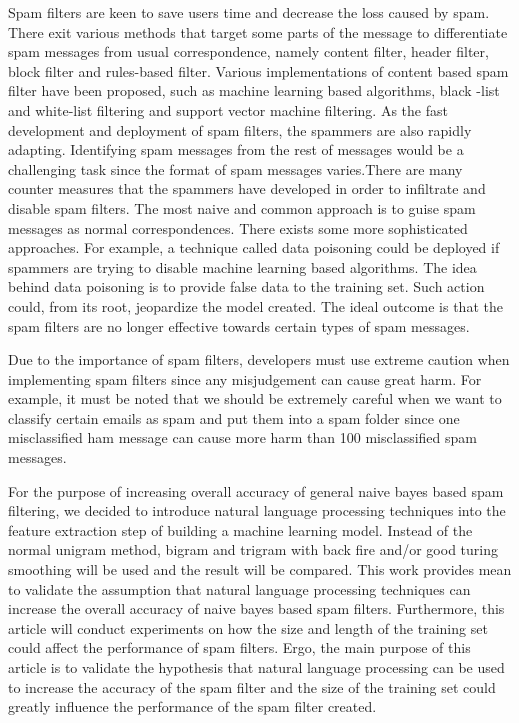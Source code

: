 \documentclass{article}
\begin{document}
Spam filters are keen to save users time and decrease the loss caused by spam. There exit various methods that target some parts of the message to differentiate spam messages from usual correspondence, namely content filter, header filter, block filter and rules-based filter. Various implementations of content based spam filter have been proposed, such as machine learning based algorithms, black -list and white-list filtering and support vector machine filtering. As the fast development and deployment of spam filters, the spammers are also rapidly adapting. Identifying spam messages from the rest of messages would be a challenging task since the format of spam messages varies.There are many counter measures that the spammers have developed in order to infiltrate and disable spam filters. The most naive and common approach is to guise spam messages as normal correspondences. There exists some more sophisticated approaches. For example, a technique called data poisoning could be deployed if spammers are trying to disable machine learning based algorithms. The idea behind data poisoning is to provide false data to the training set. Such action could, from its root, jeopardize the model created. The ideal outcome is that the spam filters are no longer effective towards certain types of spam messages. 
 
 
Due to the importance of spam filters, developers must use extreme caution when implementing spam filters since any misjudgement can cause great harm. For example, it must be noted that we should be extremely careful when we want to classify certain emails as spam and put them into a spam folder since one misclassified ham message can cause more harm than 100 misclassified spam messages.


For the purpose of increasing overall accuracy of general naive bayes based spam filtering, we decided to introduce natural language processing techniques into the feature extraction step of building a machine learning model. Instead of the normal unigram method, bigram and trigram with back fire and/or good turing smoothing will be used and the result will be compared. This work provides mean to validate the assumption that natural language processing techniques can increase the overall accuracy of naive bayes based spam filters. Furthermore, this article will conduct experiments on how the size and length of the training set could affect the performance of spam filters. Ergo, the main purpose of this article is to validate the hypothesis that natural language processing can be used to increase the accuracy of the spam filter and the size of the training set could greatly influence the performance of the spam filter created. 
\end{document}
